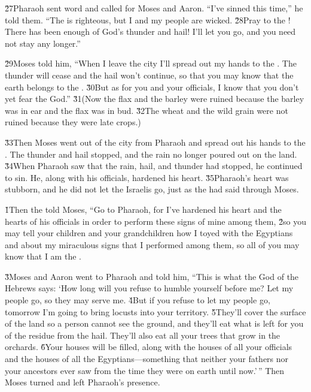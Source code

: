 \v{27}Pharaoh sent word and called for Moses and Aaron. ``I've sinned this time,'' he told them. ``The  is righteous, but I and my people are wicked. \v{28}Pray to the ! There has been enough of God's thunder and hail! I'll let you go, and you need not stay any longer.''

\v{29}Moses told him, ``When I leave the city I'll spread out my hands to the . The thunder will cease and the hail won't continue, so that you may know that the earth belongs to the . \v{30}But as for you and your officials, I know that you don't yet fear the  God.'' \v{31}(Now the flax and the barley were ruined because the barley was in ear and the flax was in bud. \v{32}The wheat and the wild grain were not ruined because they were late crops.)

\v{33}Then Moses went out of the city from Pharaoh and spread out his hands to the . The thunder and hail stopped, and the rain no longer poured out on the land. \v{34}When Pharaoh saw that the rain, hail, and thunder had stopped, he continued to sin. He, along with his officials, hardened his heart. \v{35}Pharaoh's heart was stubborn, and he did not let the Israelis go, just as the  had said through Moses.

\v{1}Then the  told Moses, ``Go to Pharaoh, for I've hardened his heart and the hearts of his officials in order to perform these signs of mine among them, \v{2}so you may tell your children and your grandchildren how I toyed with the Egyptians and about my miraculous signs that I performed among them, so all of you may know that I am the .

\v{3}Moses and Aaron went to Pharaoh and told him, ``This is what the  God of the Hebrews says: `How long will you refuse to humble yourself before me? Let my people go, so they may serve me. \v{4}But if you refuse to let my people go, tomorrow I'm going to bring locusts into your territory. \v{5}They'll cover the surface of the land so a person cannot see the ground, and they'll eat what is left for you of the residue from the hail. They'll also eat all your trees that grow in the orchards. \v{6}Your houses will be filled, along with the houses of all your officials and the houses of all the Egyptians---something that neither your fathers nor your ancestors ever saw from the time they were on earth until now.'\,'' Then Moses turned and left Pharaoh's presence.

